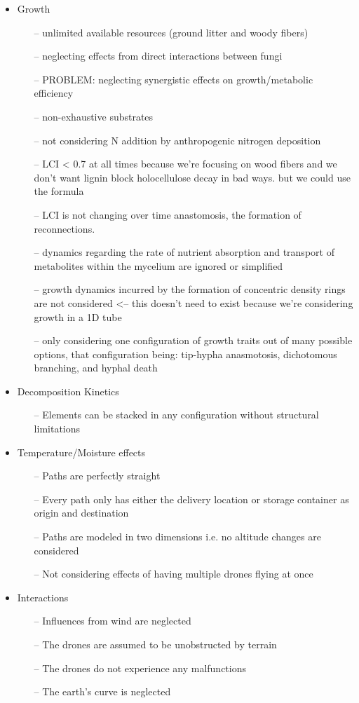 \documentclass[12pt]{article}
\begin{document}
\begin{multicols}{2}
\begin{itemize}
	\item Growth
	\begin{itemize}
		\item[--] unlimited available resources (ground litter and woody fibers)
		\item[--] neglecting effects from direct interactions between fungi
		\item[--] PROBLEM: neglecting synergistic effects on growth/metabolic efficiency
		\item[--] non-exhaustive substrates
		\item[--] not considering N addition by anthropogenic nitrogen deposition
		\item[--] LCI < 0.7 at all times because we're focusing on wood fibers and we don't want lignin block holocellulose decay in bad ways. but we could use the formula
		\item[--] LCI is not changing over time anastomosis, the formation of reconnections. 
		\item[--] dynamics regarding the rate of nutrient absorption and transport of metabolites within the
		mycelium are ignored or simplified
		\item[--] growth dynamics incurred by the formation of concentric density rings are not considered <-- this doesn't need to exist because we're considering growth in a 1D tube
		\item[--] only considering one configuration of growth traits out of many possible options, that configuration being: tip-hypha anasmotosis, dichotomous branching, and hyphal death
	\end{itemize}
	\item Decomposition Kinetics
	\begin{itemize}
		\item[--] Elements can be stacked in any configuration without structural limitations
	\end{itemize}
	\item Temperature/Moisture effects
	\begin{itemize}
		\item[--] Paths are perfectly straight
		\item[--] Every path only has either the delivery location or storage container as origin and destination
		\item[--] Paths are modeled in two dimensions i.e. no altitude changes are considered
		\item[--] Not considering effects of having multiple drones flying at once
	\end{itemize}
	\item Interactions
	\begin{itemize}
		\item[--] Influences from wind are neglected
		\item[--] The drones are assumed to be unobstructed by terrain
		\item[--] The drones do not experience any malfunctions
		\item[--] The earth’s curve is neglected
	\end{itemize}
\end{itemize}



\end{multicols}
\end{document}
